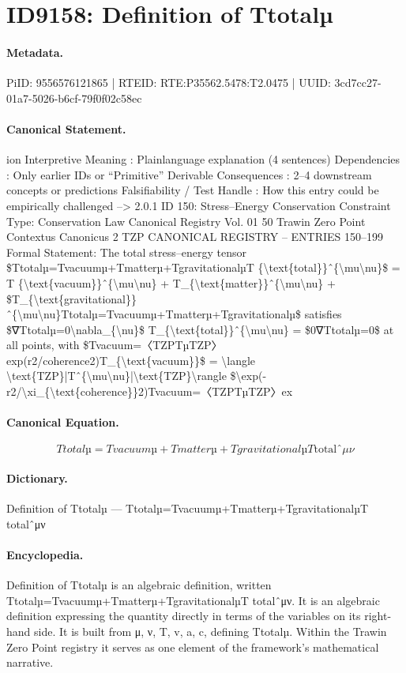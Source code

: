 \section*{ID9158: Definition of Ttotalµ}
\paragraph{Metadata.}
PiID: 9556576121865 | RTEID: RTE:P35562.5478:T2.0475 | UUID: 3cd7cc27-01a7-5026-b6cf-79f0f02c58ec

\paragraph{Canonical Statement.}
ion Interpretive Meaning : Plainlanguage explanation (4 sentences) Dependencies : Only earlier IDs or “Primitive” Derivable Consequences : 2–4 downstream concepts or predictions Falsifiability / Test Handle : How this entry could be empirically challenged --> 2.0.1 ID 150: Stress–Energy Conservation Constraint Type: Conservation Law Canonical Registry Vol. 01 50 Trawin Zero Point Contextus Canonicus 2 TZP CANONICAL REGISTRY – ENTRIES 150–199 Formal Statement: The total stress–energy tensor \$Ttotalµ=Tvacuumµ+Tmatterµ+TgravitationalµT \{\textbackslash{}text\{total\}\}ˆ\{\textbackslash{}mu\textbackslash{}nu\}\$ = T \{\textbackslash{}text\{vacuum\}\}ˆ\{\textbackslash{}mu\textbackslash{}nu\} + T\_\{\textbackslash{}text\{matter\}\}ˆ\{\textbackslash{}mu\textbackslash{}nu\} + \$T\_\{\textbackslash{}text\{gravitational\}\}ˆ\{\textbackslash{}mu\textbackslash{}nu\}Ttotalµ=Tvacuumµ+Tmatterµ+Tgravitationalµ\$ satisfies \$∇Ttotalµ=0\textbackslash{}nabla\_\{\textbackslash{}nu\}\$ T\_\{\textbackslash{}text\{total\}\}ˆ\{\textbackslash{}mu\textbackslash{}nu\} = \$0∇Ttotalµ=0\$ at all points, with \$Tvacuum=〈TZPTµTZP〉exp(r2/coherence2)T\_\{\textbackslash{}text\{vacuum\}\}\$ = \textbackslash{}langle \textbackslash{}text\{TZP\}|Tˆ\{\textbackslash{}mu\textbackslash{}nu\}|\textbackslash{}text\{TZP\}\textbackslash{}rangle \$\textbackslash{}exp(-r2/\textbackslash{}xi\_\{\textbackslash{}text\{coherence\}\}2)Tvacuum=〈TZPTµTZP〉ex

\paragraph{Canonical Equation.}
\[
Ttotalµ=Tvacuumµ+Tmatterµ+TgravitationalµT {\text{total}}ˆ{\mu\nu}
\]

\paragraph{Dictionary.}
Definition of Ttotalµ — Ttotalµ=Tvacuumµ+Tmatterµ+TgravitationalµT totalˆμν

\paragraph{Encyclopedia.}
Definition of Ttotalµ is an algebraic definition, written Ttotalµ=Tvacuumµ+Tmatterµ+TgravitationalµT totalˆμν. It is an algebraic definition expressing the quantity directly in terms of the variables on its right-hand side. It is built from μ, ν, T, v, a, c, defining Ttotalµ. Within the Trawin Zero Point registry it serves as one element of the framework's mathematical narrative.
